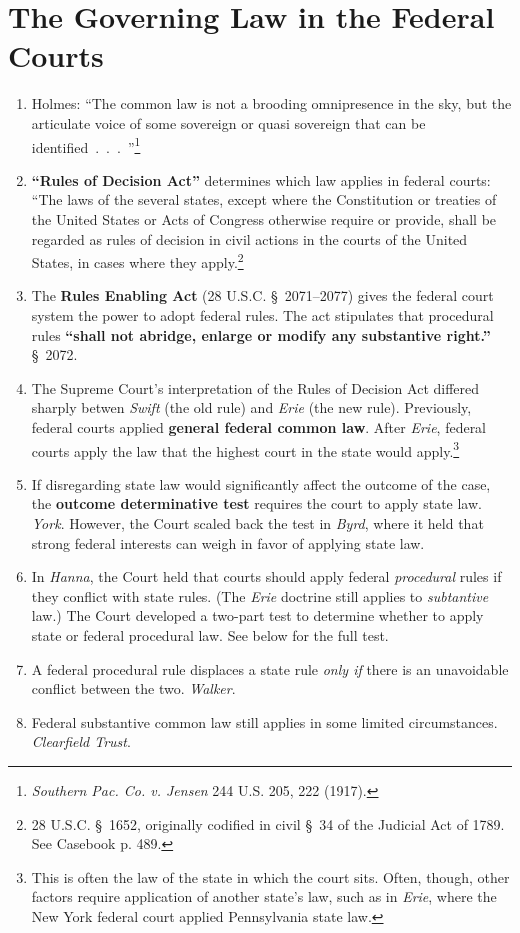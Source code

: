 \section{The Governing Law in the Federal Courts}

\begin{enumerate}
    \item Holmes: ``The common law is not a brooding omnipresence in the sky, 
    but the articulate voice of some sovereign or quasi sovereign that can be 
    identified~.~.~.~''\footnote{\emph{Southern Pac. Co. v. Jensen} 244 U.S. 205, 
    222 (1917).}
    \item \textbf{``Rules of Decision Act''} determines which law applies in 
    federal courts: ``The laws of the several states, except where the 
    Constitution or treaties of the United States or Acts of Congress 
    otherwise require or provide, shall be regarded as rules of decision in 
    civil actions in the courts of the United States, in cases where they 
    apply.\footnote{28 U.S.C. \S\ 1652, originally codified in civil \S\ 34 of 
    the Judicial Act of 1789. See Casebook p. 489.}
    \item The \textbf{Rules Enabling Act} (28 U.S.C. \S\ 2071--2077) gives the 
    federal court system the power to adopt federal rules. The act stipulates 
    that procedural rules \textbf{``shall not abridge, enlarge or modify any 
    substantive right.''} \S\ 2072.
    \item The Supreme Court's interpretation of the Rules of Decision Act 
    differed sharply betwen \emph{Swift} (the old rule) and \emph{Erie} (the 
    new rule). Previously, federal courts applied \textbf{general federal 
    common law}. After \emph{Erie}, federal courts apply the law that the 
    highest court in the state would apply.\footnote{This is often the law of 
    the state in which the court sits. Often, though, other factors require 
    application of another state's law, such as in \emph{Erie}, where the New 
    York federal court applied Pennsylvania state law.}
    \item If disregarding state law would significantly affect the outcome of 
    the case, the \textbf{outcome determinative test} requires the court to 
    apply state law. \emph{York}. However, the Court scaled back the test in 
    \emph{Byrd}, where it held that strong federal interests can weigh in 
    favor of applying state law.
    \item In \emph{Hanna}, the Court held that courts should apply federal 
    \emph{procedural} rules if they conflict with state rules. (The 
    \emph{Erie} doctrine still applies to \emph{subtantive} law.) The Court 
    developed a two-part test to determine whether to apply state or federal 
    procedural law. See below for the full test.
    \item A federal procedural rule displaces a state rule \emph{only if} 
    there is an unavoidable conflict between the two. \emph{Walker}.
    \item Federal substantive common law still applies in some limited 
    circumstances.  \emph{Clearfield Trust}.
\end{enumerate}

